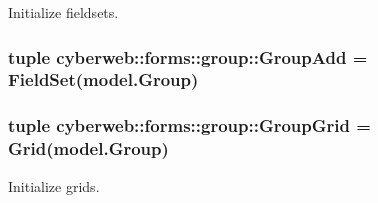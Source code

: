 \-Initialize fieldsets. 

\hypertarget{namespacecyberweb_1_1forms_1_1group_a550920d4198bf95854547a1dc0e2625f}{
\subsubsection[{\-Group\-Add}]{\setlength{\rightskip}{0pt plus 5cm}tuple {\bf cyberweb\-::forms\-::group\-::\-Group\-Add} = \-Field\-Set(model.\-Group)}}\label{namespacecyberweb_1_1forms_1_1group_a550920d4198bf95854547a1dc0e2625f}
\hypertarget{namespacecyberweb_1_1forms_1_1group_a19ddad2ed814644111700e4e810d5bff}{
\subsubsection[{\-Group\-Grid}]{\setlength{\rightskip}{0pt plus 5cm}tuple {\bf cyberweb\-::forms\-::group\-::\-Group\-Grid} = \-Grid(model.\-Group)}}\label{namespacecyberweb_1_1forms_1_1group_a19ddad2ed814644111700e4e810d5bff}


\-Initialize grids. 

